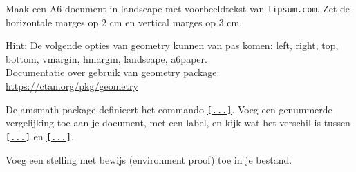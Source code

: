 \documentclass[a4paper]{article}
\begin{document}



\begin{exercise}[Geometry]\label{ex:aaaa}
    Maak een A6-document in landscape met voorbeeldtekst van \nolinkurl{lipsum.com}. Zet de
    horizontale marges op $ 2\text{ cm} $ en vertical marges op $ 3\text{ cm} $.

    Hint: De volgende opties van geometry kunnen van pas komen: left, right, top, bottom,
    vmargin, hmargin, landscape, a6paper.\\
    Documentatie over gebruik van geometry package: \url{https://ctan.org/pkg/geometry}
\end{exercise}

\begin{exercise}
    De amsmath package definieert het commando \texttt{\eqref{...}}.
    Voeg een genummerde vergelijking toe aan je document, met een label, en
    kijk wat het verschil is tussen \texttt{\ref{...}}
    en \texttt{\eqref{...}}.
\end{exercise}

\begin{exercise}
    Voeg een stelling met bewijs (environment proof) toe in je bestand.
\end{exercise}
\end{document}
